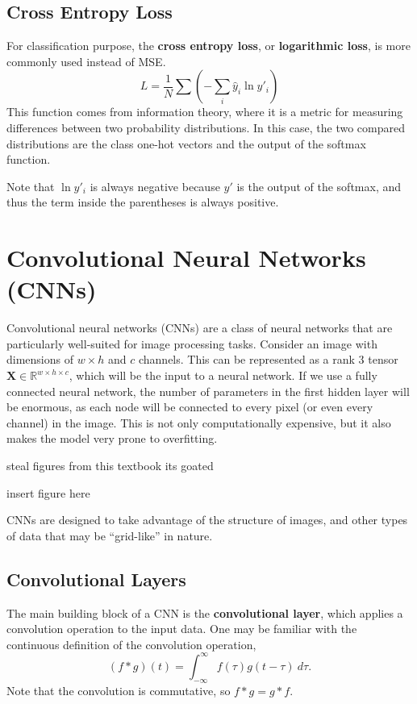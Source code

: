 \documentclass[12pt]{report}
\theoremstyle{definition}
\theoremstyle{remark}
\begin{document}
\subsection{Cross Entropy Loss}

For classification purpose, the \textbf{cross entropy loss}, or \textbf{logarithmic loss}, is more commonly used instead of MSE\@.
\begin{equation}
L = \frac{1}{N}\sum \left(-\sum_i \hat{y}_i \ln y'_i\right)
\end{equation}
This function comes from information theory, where it is a metric for measuring differences between two probability distributions. In this case, the two compared distributions are the class one-hot vectors and the output of the softmax function.

Note that $\ln y'_i$ is always negative because $y'$ is the output of the softmax, and thus the term inside the parentheses is always positive.

\section{Convolutional Neural Networks (CNNs)}\label{sec:cnn}
Convolutional neural networks (CNNs) are a class of neural networks that are particularly well-suited for image processing tasks. Consider an image with dimensions of $w \times h$ and $c$ channels. This can be represented as a rank $3$ tensor $\mathbf{X} \in \mathbb{R}^{w \times h \times c}$, which will be the input to a neural network. If we use a fully connected neural network, the number of parameters in the first hidden layer will be enormous, as each node will be connected to every pixel (or even every channel) in the image. This is not only computationally expensive, but it also makes the model very prone to overfitting.

\cite{bishop_deep_2023} steal figures from this textbook its goated

insert figure here

CNNs are designed to take advantage of the structure of images, and other types of data that may be ``grid-like'' in nature.
\subsection{Convolutional Layers}
The main building block of a CNN is the \textbf{convolutional layer}, which applies a convolution operation to the input data. One may be familiar with the continuous definition of the convolution operation,
\begin{equation}
    (f * g)(t) = \int_{-\infty}^{\infty} f(\tau) g(t - \tau)\ d\tau.
\end{equation}
Note that the convolution is commutative, so $f * g = g * f$.
\end{document}
